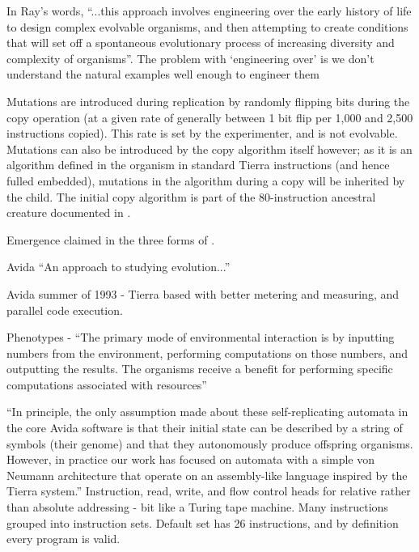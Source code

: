 In Ray's words, ``...this approach involves engineering over the early history of life to design complex evolvable organisms, and then attempting to create conditions that will set off a spontaneous evolutionary process of increasing diversity and complexity of organisms''\parencite{Taylor2001}. The problem with `engineering over' is we don't understand the natural examples well enough to engineer them \parencite{Taylor2001}

Mutations are introduced during replication by randomly flipping bits during the copy operation (at a given rate of generally between 1 bit flip per 1,000 and 2,500 instructions copied). This rate is set by the experimenter, and is not evolvable. Mutations can also be introduced by the copy algorithm itself however; as it is an algorithm defined in the organism in standard Tierra instructions (and hence fulled embedded), mutations in the algorithm during a copy will be inherited by the child. The initial copy algorithm is part of the 80-instruction ancestral creature documented in \cite[app.C]{Ray1991}.

Emergence claimed in the three forms of \cite{Cariani1991}.

Avida \parencite{Ofria2004}
``An approach to studying evolution...''

Avida summer of 1993 - Tierra based with better metering and measuring, and parallel code execution.

Phenotypes - ``The primary mode of environmental interaction is by inputting numbers from the environment, performing computations on those numbers, and outputting the results. The organisms receive a
benefit for performing specific computations associated with resources''

``In principle, the only assumption made about these self-replicating automata in the core Avida software is that their initial state can be described by a string of symbols (their genome) and that they autonomously produce offspring organisms. However, in practice our work has focused on automata with a simple von Neumann architecture that operate on an assembly-like language inspired by
the Tierra system.''
Instruction, read, write, and flow control heads for relative rather than absolute addressing - bit like a Turing tape machine. Many instructions grouped into instruction sets. Default set has 26 instructions, and by definition every program is valid.


